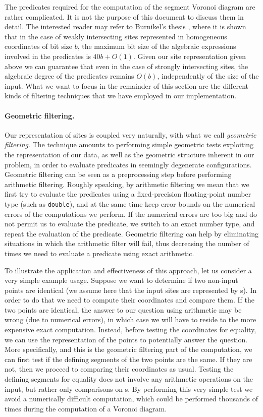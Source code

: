 The predicates required for the computation of the segment Voronoi
diagram are rather complicated. It is not the purpose of this document to
discuss them in detail. The interested reader may refer to Burnikel's
thesis \cite{b-ecvdl-96}, where it is shown that in the case of weakly
intersecting sites represented in homogeneous coordinates of bit size
$b$, the maximum bit size of the algebraic expressions involved in the
predicates is $40b+O(1)$. Given our site representation given above we
can guarantee that even in the case of strongly intersecting sites,
the algebraic degree of the predicates remains $O(b)$, independently
of the size of the input. What we want to focus in the remainder of
this section are the different kinds of filtering techniques that we
have employed in our implementation.

\paragraph{Geometric filtering.}
Our representation of sites is coupled very naturally, with what we
call {\em geometric filtering}. The technique
amounts to performing simple geometric tests exploiting the
representation of our data, as well as the geometric structure
inherent in our problem, in order to evaluate predicates in seemingly
degenerate configurations. Geometric filtering can be seen as a
preprocessing step before performing arithmetic filtering.
Roughly speaking, by arithmetic filtering we mean that we first try to
evaluate the predicates using a fixed-precision floating-point number
type (such as {\tt double}), and at the same time keep error bounds on
the numerical errors of the computations we perform. If the numerical
errors are too big and do not permit us to evaluate the predicate, we
switch to an exact number type, and repeat the evaluation of the
predicate. Geometric filtering can help by eliminating situations in
which the arithmetic filter will fail, thus decreasing the number
of times we need to evaluate a predicate using exact arithmetic.

To illustrate the application and effectiveness of this approach,
let us consider a very simple example usage.
Suppose we want to determine if two non-input points are
identical (we assume here that the input sites are represented by
s). In order to do that we need to compute their
coordinates and compare them. If the two points are identical, the
answer to our question using  arithmetic may be 
wrong (due to numerical errors), in which case we will have to reside
to the more expensive exact computation. Instead, before testing the
coordinates for equality, we can use the representation of the points
to potentially answer the question. More specifically, and this is the
geometric filtering part of the computation, we can first
test if the defining segments of the two points are the same. If they
are not, then we proceed to comparing their coordinates as
usual. Testing the defining segments for equality does not involve any
arithmetic operations on the input, but rather only comparisons on
s. By performing this very simple test we avoid a
numerically difficult computation, which could be performed
thousands of times during the computation of a Voronoi diagram.

